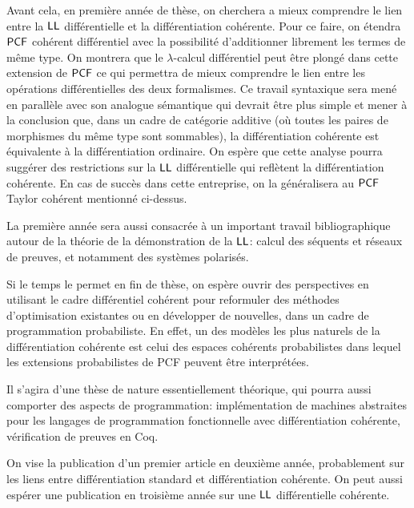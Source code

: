 \documentclass[a4]{article}
\begin{document}
Avant cela, en première année de thèse, on cherchera a mieux
comprendre le lien entre la $\hbox{\textsf{LL}}$ différentielle et la différentiation
cohérente.
%
Pour ce faire, on étendra $\mathsf{PCF}$ cohérent différentiel avec la
possibilité d'additionner librement les termes de même type.
%
On montrera que le $\lambda$-calcul différentiel peut être plongé dans
cette extension de $\mathsf{PCF}$ ce qui permettra de mieux comprendre le lien
entre les opérations différentielles des deux formalismes.
%
Ce travail syntaxique sera mené en parallèle avec son analogue
sémantique qui devrait être plus simple et mener à la conclusion que,
dans un cadre de catégorie additive (où toutes les paires de
morphismes du même type sont sommables), la différentiation cohérente
est équivalente à la différentiation ordinaire.
%
On espère que cette analyse pourra suggérer des restrictions sur la
$\hbox{\textsf{LL}}$ différentielle qui reflètent la différentiation cohérente.
%
En cas de succès dans cette entreprise, on la généralisera au $\mathsf{PCF}$
Taylor cohérent mentionné ci-dessus.

La première année sera aussi consacrée à un important travail
bibliographique autour de la théorie de la démonstration de la $\hbox{\textsf{LL}}$:
calcul des séquents et réseaux de preuves, et notamment des systèmes
polarisés. 


Si le temps le permet en fin de thèse, on espère ouvrir des
perspectives en utilisant le cadre différentiel cohérent pour
reformuler des méthodes d'optimisation existantes ou en développer de
nouvelles, dans un cadre de programmation probabiliste.
%
En effet, un des modèles les plus naturels de la différentiation
cohérente est celui des espaces cohérents probabilistes dans lequel
les extensions probabilistes de PCF peuvent être interprétées.

Il s'agira d'une thèse de nature essentiellement théorique, qui pourra
aussi comporter des aspects de programmation: implémentation de
machines abstraites pour les langages de programmation fonctionnelle
avec différentiation cohérente, vérification de preuves en Coq.

On vise la publication d'un premier article en deuxième année,
probablement sur les liens entre différentiation standard et
différentiation cohérente.
%
On peut aussi espérer une publication en troisième année sur une $\hbox{\textsf{LL}}$
différentielle cohérente.
\end{document}

